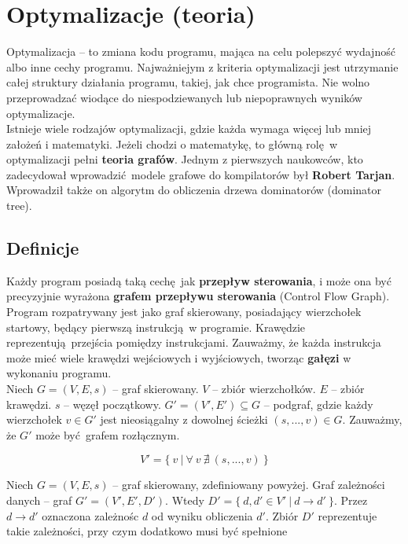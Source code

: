\section{Optymalizacje (teoria)}
	
	Optymalizacja -- to zmiana kodu programu, mająca na celu polepszyć wydajność albo inne cechy
	programu. Najważniejym z kriteria optymalizacji jest utrzymanie całej struktury działania programu,
	takiej, jak chce programista. Nie wolno przeprowadzać wiodące do niespodziewanych lub
	niepoprawnych wyników optymalizacje.
	\\
	
	Istnieje wiele rodzajów optymalizacji, gdzie każda wymaga więcej lub mniej założeń i
	matematyki. Jeżeli chodzi o matematykę, to główną rolę w optymalizacji pełni \textbf{teoria grafów}.
	Jednym z pierwszych naukowców, kto zadecydował wprowadzić modele grafowe do kompilatorów był
	\textbf{Robert Tarjan}. Wprowadził także on algorytm do obliczenia drzewa dominatorów (dominator tree).

	\subsection{Definicje}
		Każdy program posiadą taką cechę jak \textbf{przepływ sterowania}, i może ona być
		precyzyjnie wyrażona \textbf{grafem przepływu sterowania} (Control Flow Graph). Program
		rozpatrywany jest jako graf skierowany, posiadający wierzchołek startowy, będący pierwszą
		instrukcją w programie. Krawędzie reprezentują przejścia pomiędzy instrukcjami. Zauważmy,
		że każda instrukcja może mieć wiele krawędzi wejściowych i wyjściowych, tworząc \textbf{gałęzi}
		w wykonaniu programu.
		\\

		Niech $G = (V, E, s)$ -- graf skierowany.
		$V$ -- zbiór wierzchołków. $E$ -- zbiór krawędzi. $s$ -- węzęł początkowy.
		$G' = (V', E') \subseteq G$ -- podgraf, gdzie każdy wierzchołek $v \in G'$ jest nieosiągalny z
		dowolnej ścieżki $(s, ...,  v) \in G$. Zauważmy, że $G'$ może być grafem rozłącznym.

		$$V' = \{ \ v \ | \ \forall \ v \ \nexists \ (s, ..., v) \ \}$$

		\spacing

		Niech $G = (V, E, s)$ -- graf skierowany, zdefiniowany powyżej. Graf zależności danych -- graf
		$G' = (V', E', D')$. Wtedy $D' = \{ \ d, d' \in V' \ | \ d \rightarrow d' \ \}$. Przez $d \rightarrow d'$
		oznaczona zależnośc $d$ od wyniku obliczenia $d'$. Zbiór $D'$ reprezentuje takie zależności, przy czym
		dodatkowo musi być spełnione

